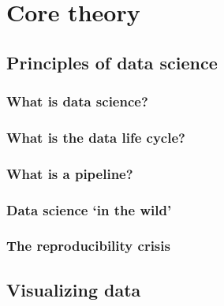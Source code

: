 \documentclass[
]{book}
\begin{document}
\hypertarget{part-core-theory}{%
\part{Core theory}\label{part-core-theory}}

\hypertarget{principles-of-data-science}{%
\chapter{Principles of data science}\label{principles-of-data-science}}

\hypertarget{what-is-data-science}{%
\section*{What is data science?}\label{what-is-data-science}}

\hypertarget{what-is-the-data-life-cycle}{%
\section*{What is the data life cycle?}\label{what-is-the-data-life-cycle}}

\hypertarget{what-is-a-pipeline}{%
\section*{What is a pipeline?}\label{what-is-a-pipeline}}

\hypertarget{data-science-in-the-wild}{%
\section*{Data science `in the wild'}\label{data-science-in-the-wild}}

\hypertarget{the-reproducibility-crisis}{%
\section*{The reproducibility crisis}\label{the-reproducibility-crisis}}

\hypertarget{dataviz}{%
\chapter{Visualizing data}\label{dataviz}}
\end{document}
